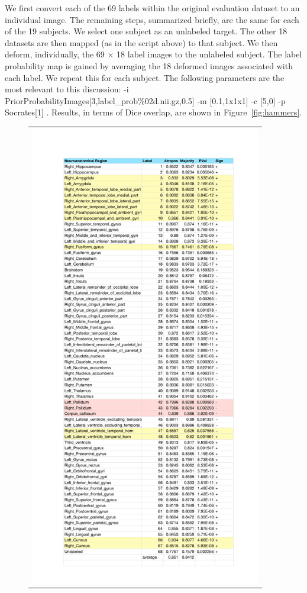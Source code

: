 \documentclass[11pt,english]{article}
\begin{document}
We first convert each of the 69 labels within the original evaluation
dataset to an individual image.  The remaining steps,
summarized briefly, are the same for each of the 19 subjects.  We
select one subject as an unlabeled target.  The other 18 datasets are
then mapped (as in the script above) to that subject.  We then deform,
individually, the 69 $\times$ 18 label images to the unlabeled
subject.  The label probability map is gained by averaging the 18
deformed images associated with each label.  We repeat this for each
subject.  The following parameters are the most relevant to this discussion:
{\ttfamily  -i  PriorProbabilityImages[3,label\_prob\%02d.nii.gz,0.5] 
-m [0.1,1x1x1] -c [5,0] -p Socrates[1] }.  Results, in terms of
Dice overlap, are shown in Figure~\ref{fig:hammers}.
\begin{figure}
\begin{center}
\begin{tabular}{c}
\includegraphics[height=8in]{Figures/final_results_majority_vote_vs_atropos.pdf}

\end{tabular}
\end{center}
\end{figure}
\end{document}
